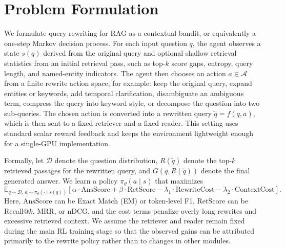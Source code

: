 \section{Problem Formulation}
We formulate query rewriting for RAG as a contextual bandit, or equivalently a one-step Markov decision process. For each input question $q$, the agent observes a state $s(q)$ derived from the original query and optional shallow retrieval statistics from an initial retrieval pass, such as top-$k$ score gaps, entropy, query length, and named-entity indicators. The agent then chooses an action $a \in \mathcal{A}$ from a finite rewrite action space, for example: keep the original query, expand entities or keywords, add temporal clarification, disambiguate an ambiguous term, compress the query into keyword style, or decompose the question into two sub-queries. The chosen action is converted into a rewritten query $\tilde{q} = f(q,a)$, which is then sent to a fixed retriever and a fixed reader. This setting uses standard scalar reward feedback and keeps the environment lightweight enough for a single-GPU implementation.

Formally, let $\mathcal{D}$ denote the question distribution, $R(\tilde{q})$ denote the top-$k$ retrieved passages for the rewritten query, and $G(q, R(\tilde{q}))$ denote the final generated answer. We learn a policy $\pi_{\theta}(a \mid s)$ that maximizes
\begin{equation}
\mathbb{E}_{q \sim \mathcal{D},\, a \sim \pi_{\theta}(\cdot \mid s(q))}\left[
\alpha \cdot \mathrm{AnsScore}
+ \beta \cdot \mathrm{RetScore}
- \lambda_{1} \cdot \mathrm{RewriteCost}
- \lambda_{2} \cdot \mathrm{ContextCost}
\right].
\end{equation}
Here, $\mathrm{AnsScore}$ can be Exact Match (EM) or token-level F1, $\mathrm{RetScore}$ can be Recall@$k$, MRR, or nDCG, and the cost terms penalize overly long rewrites and excessive retrieved context. We assume the retriever and reader remain fixed during the main RL training stage so that the observed gains can be attributed primarily to the rewrite policy rather than to changes in other modules.
